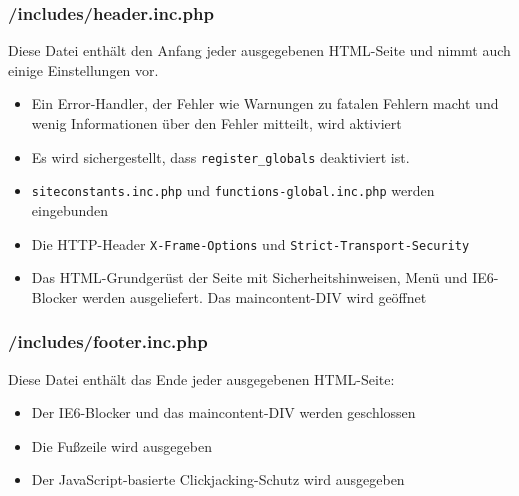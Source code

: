 \subsubsection{/includes/header.inc.php}
Diese Datei enthält den Anfang jeder ausgegebenen HTML-Seite und nimmt auch einige Einstellungen vor.
\begin{itemize}
	\item Ein Error-Handler, der Fehler wie Warnungen zu fatalen Fehlern macht und wenig Informationen über den Fehler mitteilt, wird aktiviert
	\item Es wird sichergestellt, dass \texttt{register\_globals} deaktiviert ist.
	\item \texttt{siteconstants.inc.php} und \texttt{functions-global.inc.php} werden eingebunden
	\item Die HTTP-Header \texttt{X-Frame-Options} und \texttt{Strict-Transport-Security}
	\item Das HTML-Grundgerüst der Seite mit Sicherheitshinweisen, Menü und IE6-Blocker werden ausgeliefert. Das maincontent-DIV wird geöffnet
\end{itemize}

\subsubsection{/includes/footer.inc.php}
Diese Datei enthält das Ende jeder ausgegebenen HTML-Seite:
\begin{itemize}
	\item Der IE6-Blocker und das maincontent-DIV werden geschlossen
	\item Die Fußzeile wird ausgegeben
	\item Der JavaScript-basierte Clickjacking-Schutz wird ausgegeben
\end{itemize}

